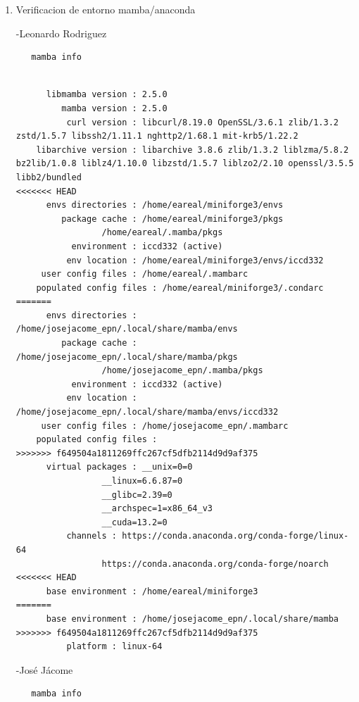\documentclass{article}
\begin{document}
\begin{enumerate}
\item Verificacion de entorno mamba/anaconda

-Leonardo Rodriguez
\begin{verbatim}
   mamba info
\end{verbatim}

\begin{verbatim}

	  libmamba version : 2.5.0
	     mamba version : 2.5.0
	      curl version : libcurl/8.19.0 OpenSSL/3.6.1 zlib/1.3.2 zstd/1.5.7 libssh2/1.11.1 nghttp2/1.68.1 mit-krb5/1.22.2
	libarchive version : libarchive 3.8.6 zlib/1.3.2 liblzma/5.8.2 bz2lib/1.0.8 liblz4/1.10.0 libzstd/1.5.7 liblzo2/2.10 openssl/3.5.5 libb2/bundled
<<<<<<< HEAD
	  envs directories : /home/eareal/miniforge3/envs
	     package cache : /home/eareal/miniforge3/pkgs
			     /home/eareal/.mamba/pkgs
	       environment : iccd332 (active)
	      env location : /home/eareal/miniforge3/envs/iccd332
	 user config files : /home/eareal/.mambarc
    populated config files : /home/eareal/miniforge3/.condarc
=======
	  envs directories : /home/josejacome_epn/.local/share/mamba/envs
	     package cache : /home/josejacome_epn/.local/share/mamba/pkgs
			     /home/josejacome_epn/.mamba/pkgs
	       environment : iccd332 (active)
	      env location : /home/josejacome_epn/.local/share/mamba/envs/iccd332
	 user config files : /home/josejacome_epn/.mambarc
    populated config files : 
>>>>>>> f649504a1811269ffc267cf5dfb2114d9d9af375
	  virtual packages : __unix=0=0
			     __linux=6.6.87=0
			     __glibc=2.39=0
			     __archspec=1=x86_64_v3
			     __cuda=13.2=0
		  channels : https://conda.anaconda.org/conda-forge/linux-64
			     https://conda.anaconda.org/conda-forge/noarch
<<<<<<< HEAD
	  base environment : /home/eareal/miniforge3
=======
	  base environment : /home/josejacome_epn/.local/share/mamba
>>>>>>> f649504a1811269ffc267cf5dfb2114d9d9af375
		  platform : linux-64
\end{verbatim}

-José Jácome
\begin{verbatim}
   mamba info
\end{verbatim}

\begin{verbatim}


\end{verbatim}
\end{enumerate}
\end{document}
